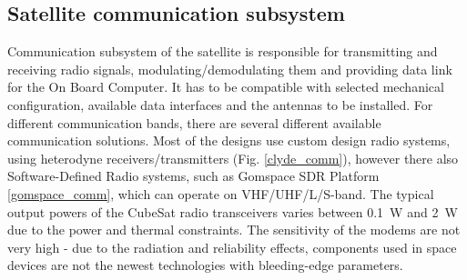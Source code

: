 \subsection{Satellite communication subsystem}
Communication subsystem of the satellite is responsible for transmitting and receiving radio signals, modulating/demodulating them and providing data link for the On Board Computer. It has to be compatible with selected mechanical configuration, available data interfaces and the antennas to be installed. For different communication bands, there are several different available communication solutions. Most of the designs use custom design radio systems, using heterodyne receivers/transmitters (Fig. \ref{clyde_comm}), however there also Software-Defined Radio systems, such as Gomspace SDR Platform \ref{gomspace_comm}, which can operate on VHF/UHF/L/S-band. The typical output powers of the CubeSat radio transceivers varies between \SI{0.1}{\watt} and \SI{2}{\watt} due to the power and thermal constraints. The sensitivity of the modems are not very high - due to the radiation and reliability effects, components used in space devices are not the newest technologies with bleeding-edge parameters.

